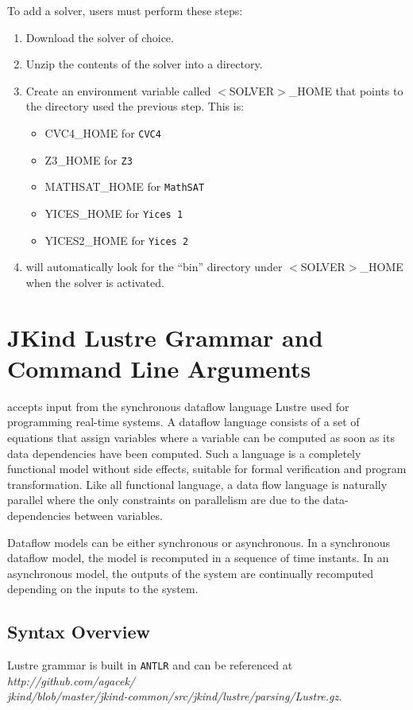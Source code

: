 To add a solver, users must perform these steps:
\begin{enumerate}
  \item Download the solver of choice.
  \item Unzip the contents of the solver into a directory.
  \item Create an environment variable called $<$SOLVER$>$\_HOME that points to the directory used the previous step. This is:
      \begin{itemize}
        \item CVC4\_HOME for \texttt{CVC4}
        \item Z3\_HOME for \texttt{Z3}
        \item MATHSAT\_HOME for \texttt{MathSAT}
        \item YICES\_HOME for \texttt{Yices 1}
        \item YICES2\_HOME for \texttt{Yices 2}
      \end{itemize}
  \item \jkind will automatically look for the ``bin'' directory under $<$SOLVER$>$\_HOME when the solver is activated.
\end{enumerate}


\section{{\sc JKind} Lustre Grammar and Command Line Arguments}
\jkind accepts input from the synchronous dataflow language Lustre used for programming real-time systems. A dataflow language consists of a set of equations that assign variables where a variable can be computed as soon as its data dependencies have been computed. Such a language is a completely functional model without side effects, suitable for formal verification and program transformation. Like all functional language, a data flow language is naturally parallel where the only constraints on parallelism are due to the data-dependencies between variables. 

Dataflow models can be either synchronous or asynchronous. In a synchronous dataflow model, the model is recomputed in a sequence of time instants. In an asynchronous model, the outputs of the system are continually recomputed depending on the inputs to the system.

\subsection{Syntax Overview}
\jkind Lustre grammar is built in \texttt{ANTLR} and can be referenced at 
\emph{http://github.com/agacek/\\jkind/blob/master/jkind-common/src/jkind/lustre/parsing/Lustre.gz}.

